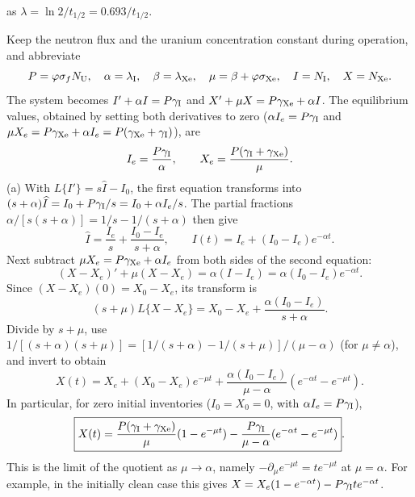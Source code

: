 as $\lambda=\ln 2/t_{1/2}=0.693/t_{1/2}$.
\par{}
\solution
Keep the neutron flux and the uranium concentration
constant during operation, and abbreviate
\[
P=\varphi\sigma_fN_{\rm U},\quad
\alpha=\lambda_{\rm I},\quad\beta=\lambda_{\rm Xe},\quad
\mu=\beta+\varphi\sigma_{\rm Xe},\quad
I=N_{\rm I},\quad X=N_{\rm Xe}.
\]
The system becomes $I'+\alpha I=P\gamma_{\rm I}$ and
$X'+\mu X=P\gamma_{\rm Xe}+\alpha I$.
The equilibrium values, obtained by setting both derivatives
to zero ($\alpha I_e=P\gamma_{\rm I}$ and
$\mu X_e=P\gamma_{\rm Xe}+\alpha I_e
=P(\gamma_{\rm Xe}+\gamma_{\rm I})$), are
\[
I_e=\frac{P\gamma_{\rm I}}\alpha,\qquad
X_e=\frac{P(\gamma_{\rm I}+\gamma_{\rm Xe})}{\mu}.
\]
(a) With $L\{I'\}=s\widehat I-I_0$, the first equation
transforms into
$(s+\alpha)\widehat I=I_0+P\gamma_{\rm I}/s=I_0+\alpha I_e/s$.
The partial fractions $\alpha/[s(s+\alpha)]=1/s-1/(s+\alpha)$
then give
\[
\widehat I=\frac{I_e}s+\frac{I_0-I_e}{s+\alpha},\qquad
I(t)=I_e+(I_0-I_e)e^{-\alpha t}.
\]
Next subtract $\mu X_e=P\gamma_{\rm Xe}+\alpha I_e$ from both
sides of the second equation:
\[
(X-X_e)'+\mu(X-X_e)=\alpha(I-I_e)
=\alpha(I_0-I_e)e^{-\alpha t}.
\]
Since $(X-X_e)(0)=X_0-X_e$, its transform is
\[
(s+\mu)L\{X-X_e\}=X_0-X_e+
\frac{\alpha(I_0-I_e)}{s+\alpha}.
\]
Divide by $s+\mu$, use
$1/[(s+\alpha)(s+\mu)]
=[1/(s+\alpha)-1/(s+\mu)]/(\mu-\alpha)$ (for $\mu\ne\alpha$),
and invert to obtain
\[
\boxed{X(t)=X_e+(X_0-X_e)e^{-\mu t}
+\frac{\alpha(I_0-I_e)}{\mu-\alpha}
(e^{-\alpha t}-e^{-\mu t})}.
\]
In particular, for zero initial inventories ($I_0=X_0=0$,
with $\alpha I_e=P\gamma_{\rm I}$),
\[
\boxed{X(t)=\frac{P(\gamma_{\rm I}+\gamma_{\rm Xe})}{\mu}
(1-e^{-\mu t})
-\frac{P\gamma_{\rm I}}{\mu-\alpha}
(e^{-\alpha t}-e^{-\mu t})}.
\]
This is the limit of the quotient as $\mu\to\alpha$, namely
$-\partial_\mu e^{-\mu t}=te^{-\mu t}$ at $\mu=\alpha$.
For example, in the initially clean case this gives
$X=X_e(1-e^{-\alpha t})-P\gamma_{\rm I}t e^{-\alpha t}$.

